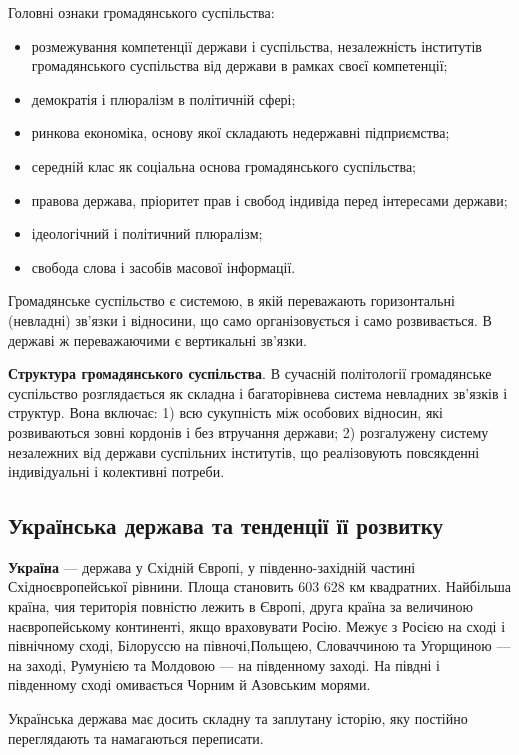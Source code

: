 Головні ознаки громадянського суспільства:
\begin{itemize}
\item розмежування компетенції держави і суспільства, незалежність інститутів громадянського суспільства від держави в рамках своєї компетенції;
\item демократія і плюралізм в політичній сфері;
\item ринкова економіка, основу якої складають недержавні підприємства;
\item середній клас як соціальна основа громадянського суспільства;
\item правова держава, пріоритет прав і свобод індивіда перед інтересами держави;
\item ідеологічний і політичний плюралізм;
\item свобода слова і засобів масової інформації.
\end{itemize}
Громадянське суспільство є системою, в якій переважають горизонтальні (невладні) зв'язки і відносини, що само організовується і само розвивається. В державі ж переважаючими є вертикальні зв'язки.

\textbf{Структура громадянського суспільства}. В сучасній політології громадянське суспільство розглядається як складна і багаторівнева система невладних зв'язків і структур. Вона включає: 1) всю сукупність між особових відносин, які розвиваються зовні кордонів і без втручання держави; 2) розгалужену систему незалежних від держави суспільних інститутів, що реалізовують повсякденні індивідуальні і колективні потреби.
\subsection{Українська держава та тенденції її розвитку}
\textbf{Україна} — держава у Східній Європі, у південно-західній частині Східноєвропейської рівнини. Площа становить 603 628 км квадратних. Найбільша країна, чия територія повністю лежить в Європі, друга країна за величиною наєвропейському континенті, якщо враховувати Росію. Межує з Росією на сході і північному сході, Білоруссю на півночі,Польщею, Словаччиною та Угорщиною — на заході, Румунією та Молдовою — на південному заході. На півдні і південному сході омивається Чорним й Азовським морями.

Українська держава має досить складну та заплутану історію, яку постійно переглядають та намагаються переписати.

